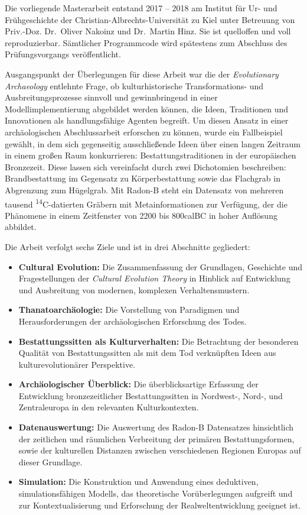 \documentclass[openany,twoside,twocolumn]{book}
\providecommand{\tightlist}{%
  \setlength{\itemsep}{0pt}\setlength{\parskip}{0pt}}
\begin{document}
Die vorliegende Masterarbeit entstand 2017 -- 2018 am Institut für Ur- und Frühgeschichte der Christian-Albrechts-Universität zu Kiel unter Betreuung von Priv.-Doz. Dr.~Oliver Nakoinz und Dr.~Martin Hinz. Sie ist quelloffen und voll reproduzierbar. Sämtlicher Programmcode wird spätestens zum Abschluss des Prüfungsvorgangs veröffentlicht.

Ausgangspunkt der Überlegungen für diese Arbeit war die der \emph{Evolutionary Archaeology} entlehnte Frage, ob kulturhistorische Transformations- und Ausbreitungsprozesse sinnvoll und gewinnbringend in einer Modellimplementierung abgebildet werden können, die Ideen, Traditionen und Innovationen als handlungsfähige Agenten begreift. Um diesen Ansatz in einer archäologischen Abschlussarbeit erforschen zu können, wurde ein Fallbeispiel gewählt, in dem sich gegenseitig ausschließende Ideen über einen langen Zeitraum in einem großen Raum konkurrieren: Bestattungstraditionen in der europäischen Bronzezeit. Diese lassen sich vereinfacht durch zwei Dichotomien beschreiben: Brandbestattung im Gegensatz zu Körperbestattung sowie das Flachgrab in Abgrenzung zum Hügelgrab. Mit Radon-B steht ein Datensatz von mehreren tausend \textsuperscript{14}C-datierten Gräbern mit Metainformationen zur Verfügung, der die Phänomene in einem Zeitfenster von 2200 bis 800calBC in hoher Auflösung abbildet.

Die Arbeit verfolgt sechs Ziele und ist in drei Abschnitte gegliedert:

\begin{itemize}
\tightlist
\item
  \textbf{Cultural Evolution:} Die Zusammenfassung der Grundlagen, Geschichte und Fragestellungen der \emph{Cultural Evolution Theory} in Hinblick auf Entwicklung und Ausbreitung von modernen, komplexen Verhaltensmustern.
\item
  \textbf{Thanatoarchäologie:} Die Vorstellung von Paradigmen und Herausforderungen der archäologischen Erforschung des Todes.
\item
  \textbf{Bestattungssitten als Kulturverhalten:} Die Betrachtung der besonderen Qualität von Bestattungssitten als mit dem Tod verknüpften Ideen aus kulturevolutionärer Perspektive.
\item
  \textbf{Archäologischer Überblick:} Die überblicksartige Erfassung der Entwicklung bronzezeitlicher Bestattungssitten in Nordwest-, Nord-, und Zentraleuropa in den relevanten Kulturkontexten.
\item
  \textbf{Datenauswertung:} Die Auswertung des Radon-B Datensatzes hinsichtlich der zeitlichen und räumlichen Verbreitung der primären Bestattungsformen, sowie der kulturellen Distanzen zwischen verschiedenen Regionen Europas auf dieser Grundlage.
\item
  \textbf{Simulation:} Die Konstruktion und Anwendung eines deduktiven, simulationsfähigen Modells, das theoretische Vorüberlegungen aufgreift und zur Kontextualisierung und Erforschung der Realweltentwicklung geeignet ist.
\end{itemize}
\end{document}
